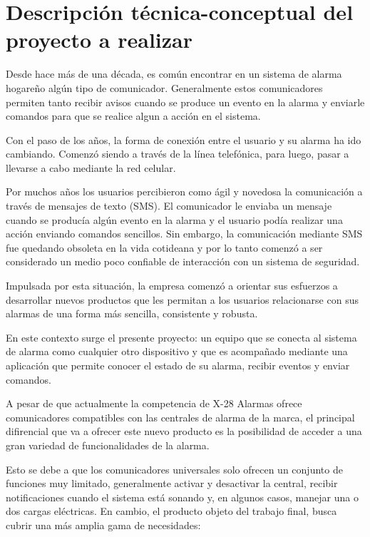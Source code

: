 \documentclass[
11pt, %
codirector, %
]{charter}
\begin{document}
\section{Descripción técnica-conceptual del proyecto a realizar}
\label{sec:descripcion}


Desde hace más de una década, es común encontrar en un sistema de alarma hogareño algún tipo de comunicador. Generalmente estos comunicadores permiten tanto recibir avisos cuando se produce un evento en la alarma y enviarle comandos para que se realice algun a acción en el sistema.

Con el paso de los años, la forma de conexión entre el usuario y su alarma ha ido cambiando. Comenzó siendo a través de la línea telefónica, para luego, pasar a llevarse a cabo mediante la red celular. 

Por muchos años los usuarios percibieron como ágil y novedosa la comunicación a través de mensajes de texto (SMS). El comunicador le enviaba un mensaje cuando se producía algún evento en la alarma y el usuario podía realizar una acción enviando comandos sencillos. Sin embargo, la comunicación mediante SMS fue quedando obsoleta en la vida cotideana y por lo tanto comenzó a ser considerado un medio poco confiable de interacción con un sistema de seguridad.

Impulsada por esta situación, la empresa comenzó a orientar sus esfuerzos a desarrollar nuevos productos que les permitan a los usuarios relacionarse con sus alarmas de una forma más sencilla, consistente y robusta.

En este contexto surge el presente proyecto: un equipo que se conecta al sistema de alarma como cualquier otro dispositivo y que es acompañado mediante una aplicación que permite conocer el estado de su alarma, recibir eventos y enviar comandos.

A pesar de que actualmente la competencia de X-28 Alarmas ofrece comunicadores compatibles con las centrales de alarma de la marca, el principal difirencial que va a ofrecer este nuevo producto es la posibilidad de acceder a una gran variedad de funcionalidades de la alarma. 

Esto se debe a que los comunicadores universales solo ofrecen un conjunto de funciones muy limitado, generalmente activar y desactivar la central, recibir notificaciones cuando el sistema está sonando y, en algunos casos, manejar una o dos cargas eléctricas. En cambio, el producto objeto del trabajo final, busca cubrir una más amplia gama de necesidades:
\end{document}

